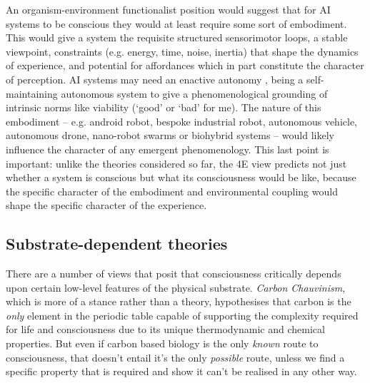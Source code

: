 \documentclass[11pt, a4paper, onecolumn, gdm]{google}
\begin{document}
An organism-environment functionalist position would suggest that for AI systems to be conscious they would at least require some sort of embodiment.
This would give a system the requisite structured sensorimotor loops, a stable viewpoint, constraints (e.g. energy, time, noise, inertia) that shape the dynamics of experience, and potential for affordances which in part constitute the character of perception.
AI systems may need an enactive autonomy \citep{barandiaran2017}, being a self-maintaining autonomous system to give a phenomenological grounding of intrinsic norms like viability (`good' or `bad' for me).
The nature of this embodiment -- e.g. android robot, bespoke industrial robot, autonomous vehicle, autonomous drone, nano-robot swarms or biohybrid systems -- would likely influence the character of any emergent phenomenology.
This last point is important: unlike the theories considered so far, the 4E view predicts not just whether a system is conscious but what its consciousness would be like, because the specific character of the embodiment and environmental coupling would shape the specific character of the experience.

\subsection{Substrate-dependent theories}\label{substrate-dependent-theories}

There are a number of views that posit that consciousness critically depends upon certain low-level features of the physical substrate.
\emph{Carbon Chauvinism}, which is more of a stance rather than a theory, hypothesises that carbon is the \emph{only} element in the periodic table capable of supporting the complexity required for life and consciousness due to its unique thermodynamic and chemical properties.
But even if carbon based biology is the only \emph{known} route to consciousness, that doesn't entail it's the only \emph{possible} route, unless we find a specific property that is required and show it can't be realised in any other way.
\end{document}
